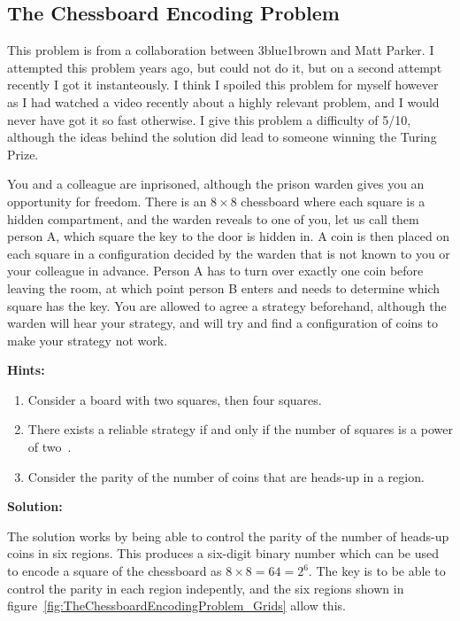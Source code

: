 \subsection{The Chessboard Encoding Problem}

This problem is from a collaboration between 3blue1brown and Matt Parker. I attempted this problem years ago, but could not do it, but on a second attempt recently I got it instanteously. I think I spoiled this problem for myself however as I had watched a video recently about a highly relevant problem, and I would never have got it so fast otherwise. I give this problem a difficulty of 5/10, although the ideas behind the solution did lead to someone winning the Turing Prize.

You and a colleague are inprisoned, although the prison warden gives you an opportunity for freedom. There is an $8 \times 8$ chessboard where each square is a hidden compartment, and the warden reveals to one of you, let us call them person A, which square the key to the door is hidden in. A coin is then placed on each square in a configuration decided by the warden that is not known to you or your colleague in advance. Person A has to turn over exactly one coin before leaving the room, at which point person B enters and needs to determine which square has the key. You are allowed to agree a strategy beforehand, although the warden will hear your strategy, and will try and find a configuration of coins to make your strategy not work.

\textbf{Hints:}

\begin{enumerate}
	\item Consider a board with two squares, then four squares.
	\item There exists a reliable strategy if and only if the number of squares is a power of two~\cite{}.
	\item Consider the parity of the number of coins that are heads-up in a region.
\end{enumerate}

\textbf{Solution:}

The solution works by being able to control the parity of the number of heads-up coins in six regions. This produces a six-digit binary number which can be used to encode a square of the chessboard as $8 \times 8 = 64 = 2^6$. The key is to be able to control the parity in each region indepently, and the six regions shown in figure~\ref{fig:TheChessboardEncodingProblem_Grids} allow this.


